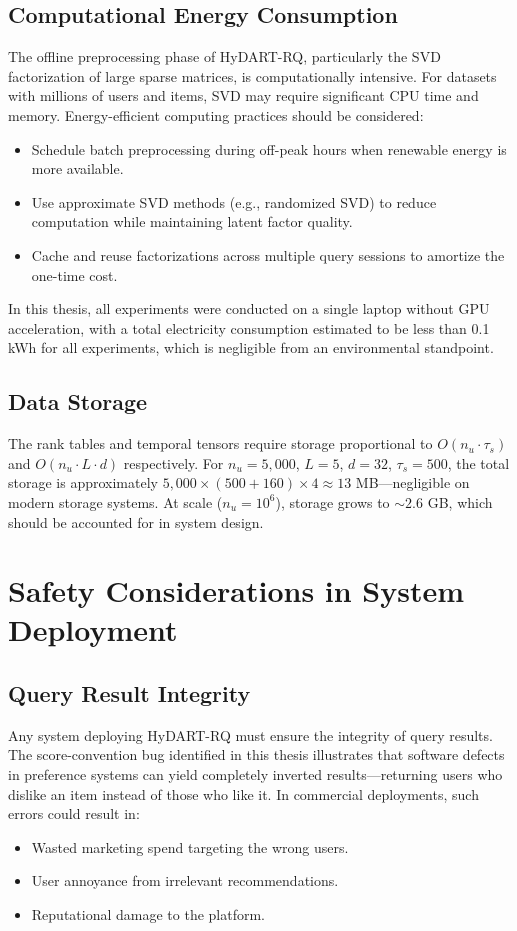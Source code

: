 \subsection{Computational Energy Consumption}

The offline preprocessing phase of HyDART-RQ, particularly the SVD factorization of large sparse matrices, is computationally intensive. For datasets with millions of users and items, SVD may require significant CPU time and memory. Energy-efficient computing practices should be considered:
\begin{itemize}
  \item Schedule batch preprocessing during off-peak hours when renewable energy is more available.
  \item Use approximate SVD methods (e.g., randomized SVD) to reduce computation while maintaining latent factor quality.
  \item Cache and reuse factorizations across multiple query sessions to amortize the one-time cost.
\end{itemize}

In this thesis, all experiments were conducted on a single laptop without GPU acceleration, with a total electricity consumption estimated to be less than 0.1 kWh for all experiments, which is negligible from an environmental standpoint.

\subsection{Data Storage}

The rank tables and temporal tensors require storage proportional to $O(n_u \cdot \tau_s)$ and $O(n_u \cdot L \cdot d)$ respectively. For $n_u = 5{,}000$, $L=5$, $d=32$, $\tau_s=500$, the total storage is approximately $5{,}000 \times (500 + 160) \times 4 \approx 13$ MB---negligible on modern storage systems. At scale ($n_u = 10^6$), storage grows to $\sim 2.6$ GB, which should be accounted for in system design.

\section{Safety Considerations in System Deployment}

\subsection{Query Result Integrity}

Any system deploying HyDART-RQ must ensure the integrity of query results. The score-convention bug identified in this thesis illustrates that software defects in preference systems can yield completely inverted results---returning users who dislike an item instead of those who like it. In commercial deployments, such errors could result in:
\begin{itemize}
  \item Wasted marketing spend targeting the wrong users.
  \item User annoyance from irrelevant recommendations.
  \item Reputational damage to the platform.
\end{itemize}

